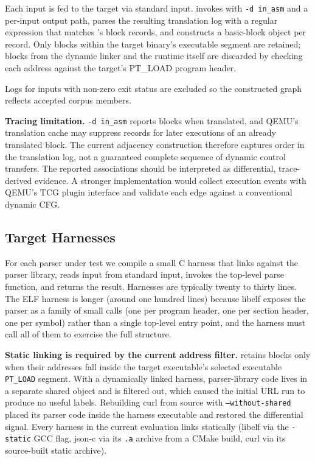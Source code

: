 Each input is fed to the target via standard input.
\toolname invokes \QEMU with \texttt{-d in\_asm} and a per-input output path, parses the resulting translation log with a regular expression that matches \QEMU's block records, and constructs a basic-block object per record.
Only blocks within the target binary's executable segment are retained; blocks from the dynamic linker and the \QEMU runtime itself are discarded by checking each address against the target's PT\_LOAD program header.

Logs for inputs with non-zero exit status are excluded so the constructed graph reflects accepted corpus members.

\textbf{Tracing limitation.}
\texttt{-d in\_asm} reports blocks when translated, and QEMU's translation cache may suppress records for later executions of an already translated block.
The current adjacency construction therefore captures order in the translation log, not a guaranteed complete sequence of dynamic control transfers.
The reported associations should be interpreted as differential, trace-derived evidence.
A stronger implementation would collect execution events with QEMU's TCG plugin interface and validate each edge against a conventional dynamic CFG.

\subsection{Target Harnesses}\label{sec:impl:harness}

For each parser under test we compile a small C harness that links against the parser library, reads input from standard input, invokes the top-level parse function, and returns the result.
Harnesses are typically twenty to thirty lines.
The ELF harness is longer (around one hundred lines) because libelf exposes the parser as a family of small calls (one per program header, one per section header, one per symbol) rather than a single top-level entry point, and the harness must call all of them to exercise the full structure.

\textbf{Static linking is required by the current address filter.}
\toolname retains blocks only when their addresses fall inside the target executable's selected executable \texttt{PT\_LOAD} segment.
With a dynamically linked harness, parser-library code lives in a separate shared object and is filtered out, which caused the initial URL run to produce no useful labels.
Rebuilding curl from source with \texttt{--without-shared} placed its parser code inside the harness executable and restored the differential signal.
Every harness in the current evaluation links statically (libelf via the \texttt{-static} GCC flag, json-c via its \texttt{.a} archive from a CMake build, curl via its source-built static archive).

